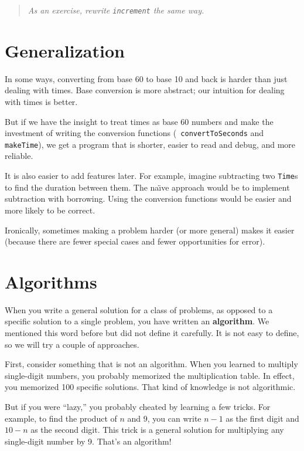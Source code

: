 \begin{quote}
{\em As an exercise, rewrite {\tt increment} the same way.}
\end{quote}


\section{Generalization}

In some ways, converting from base 60 to base 10 and back is harder
than just dealing with times.  Base conversion is more abstract; our
intuition for dealing with times is better.

But if we have the insight to treat times as base 60 numbers and make
the investment of writing the conversion functions ({\tt
convertToSeconds} and {\tt makeTime}), we get a program that is
shorter, easier to read and debug, and more reliable.

It is also easier to add features later.  For example, imagine
subtracting two {\tt Time}s to find the duration between them.  The
na\"{\i}ve approach would be to implement subtraction with borrowing.
Using the conversion functions would be easier and more likely to be
correct.

Ironically, sometimes making a problem harder (or more general) makes it
easier (because there are fewer special cases and fewer opportunities
for error).


\section{Algorithms}

When you write a general solution for a class of problems, as opposed
to a specific solution to a single problem, you have written an {\bf
algorithm}.  We mentioned this word before but did not define it
carefully.  It is not easy to define, so we will try a couple of
approaches.

First, consider something that is not an algorithm.  When you learned
to multiply single-digit numbers, you probably memorized the
multiplication table.  In effect, you memorized 100 specific solutions.
That kind of knowledge is not algorithmic.

But if you were ``lazy,'' you probably cheated by learning a few
tricks.  For example, to find the product of $n$ and 9, you can
write $n-1$ as the first digit and $10-n$ as the second
digit.  This trick is a general solution for multiplying any
single-digit number by 9.  That's an algorithm!

